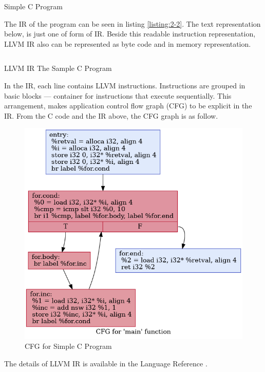 \begin{listing}
\inputminted[]{c}{code/sample.c}
\caption{Simple C Program}    
\label{listing:2-1}
\end{listing}

The IR of the program can be seen in listing \ref{listing:2-2}. The text representation below, is just one of form of IR. Beside this readable instruction representation, LLVM IR also can be represented as byte code and in memory representation.

\begin{listing}
\inputminted[]{llvm}{code/sample.ll}
\caption{LLVM IR The Sample C Program}    
\label{listing:2-2}
\end{listing}

In the IR, each line contains LLVM instructions. Instructions are grouped in basic blocks — container for instructions that execute sequentially. This arrangement, makes application control flow graph (CFG) to be explicit in the IR. From the C code and the IR above, the CFG graph is as follow.

\begin{figure}[htbp]
\centerline{\includegraphics[scale=.5]{Figures/cfg.png}}
\caption{CFG for Simple C Program}
\label{fig:2-1}
\end{figure}

The details of LLVM IR is available in the Language Reference \cite{LLVMLanguageReferencea}.

